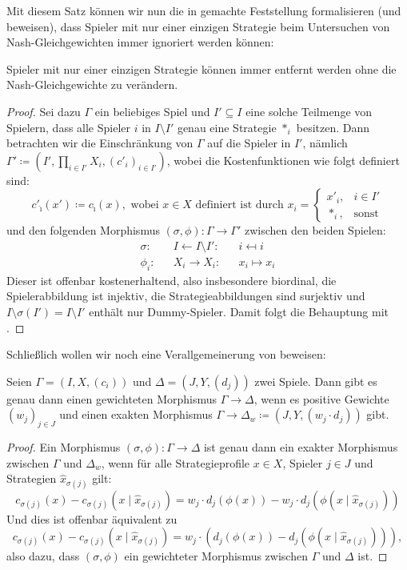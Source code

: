 Mit diesem Satz können wir nun die in  gemachte Feststellung formalisieren (und beweisen), dass Spieler mit nur einer einzigen Strategie beim Untersuchen von Nash-Gleichgewichten immer ignoriert werden können:

\begin{kor}\label{kor:EinStratSpielerWeglassen}
	Spieler mit nur einer einzigen Strategie können immer entfernt werden ohne die Nash-Gleichgewichte zu verändern.
\end{kor}

\begin{proof}
	Sei dazu $\Gamma$ ein beliebiges Spiel und $I' \subseteq I$ eine solche Teilmenge von Spielern, dass alle Spieler $i$ in $I \setminus I'$ genau eine Strategie $\ast_i$ besitzen. Dann betrachten wir die Einschränkung von $\Gamma$ auf die Spieler in $I'$, nämlich $\Gamma' \coloneqq (I', \prod_{i \in I'}X_i, (c'_i)_{i \in I'})$, wobei die Kostenfunktionen wie folgt definiert sind:
		\[c'_{\hat{\imath}}(x') \coloneqq c_{\hat{\imath}}(x), \text{ wobei $x \in X$ definiert ist durch } x_i = \begin{cases}x'_i, &i \in I'\\ \ast_i, &\text{sonst}\end{cases}\]
	und den folgenden Morphismus $(\sigma, \phi): \Gamma \to \Gamma'$ zwischen den beiden Spielen:
	\begin{align*}
		\sigma:	&&I		\leftarrow	I\setminus I':	&&i		\mapsfrom	i  \\
		\phi_i:	&&X_i	\to	 		X_i:			&&x_i	\mapsto		x_i
	\end{align*}	
	Dieser ist offenbar kostenerhaltend, also insbesondere biordinal, die Spielerabbildung ist injektiv, die Strategieabbildungen sind surjektiv und $I\setminus \sigma(I') = I \setminus I'$ enthält nur Dummy-Spieler. Damit folgt die Behauptung mit .
\end{proof}

Schließlich wollen wir noch eine Verallgemeinerung von  beweisen:

\begin{lemma}
	Seien $\Gamma = (I, X, (c_i))$ und $\Delta = (J, Y, (d_j))$ zwei Spiele. Dann gibt es genau dann einen gewichteten Morphismus $\Gamma \to \Delta$, wenn es positive Gewichte $(w_j)_{j\in J}$ und einen exakten Morphismus $\Gamma \to \Delta_w \coloneqq (J, Y, (w_j\cdot d_j))$ gibt.
\end{lemma}

\begin{proof}
	Ein Morphismus $(\sigma, \phi): \Gamma \to \Delta$ ist genau dann ein exakter Morphismus zwischen $\Gamma$ und $\Delta_w$, wenn für alle Strategieprofile $x \in X$, Spieler $j \in J$ und Strategien $\hat{x}_{\sigma(j)}$ gilt:
		\[c_{\sigma(j)}(x) - c_{\sigma(j)}(x \mid \hat{x}_{\sigma(j)}) = w_j \cdot d_j(\phi(x)) - w_j \cdot d_j(\phi(x \mid \hat{x}_{\sigma(j)}))\]
	Und dies ist offenbar äquivalent zu
		\[c_{\sigma(j)}(x) - c_{\sigma(j)}(x \mid \hat{x}_{\sigma(j)}) = w_j \cdot \left(d_j(\phi(x)) - d_j(\phi(x \mid \hat{x}_{\sigma(j)}))\right),\]
	also dazu, dass $(\sigma, \phi)$ ein gewichteter Morphismus zwischen $\Gamma$ und $\Delta$ ist.
\end{proof}